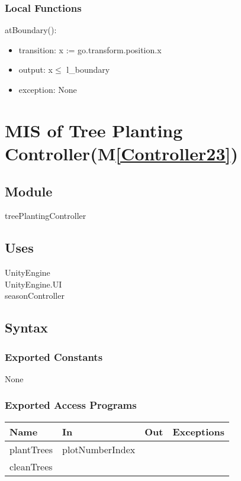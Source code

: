 \documentclass[12pt, titlepage]{article}
\newcommand{\mref}[1]{M\ref{#1}}
\begin{document}
\subsubsection{Local Functions}

\noindent atBoundary():
\begin{itemize}
\item transition: x := go.transform.position.x\\
\item output: x$\leqslant$ l\_boundary\\
\item exception: None\\
\end{itemize}

\newpage

\section{MIS of Tree Planting Controller(\mref{Controller23})}  

\subsection{Module}

treePlantingController

\subsection{Uses}
UnityEngine\\
UnityEngine.UI\\
seasonController\\

\subsection{Syntax}
\subsubsection{Exported Constants}
None
\subsubsection{Exported Access Programs}

\begin{center}
\begin{tabular}{| l | l | l | p{5cm}|}
\hline
\textbf{Name} & \textbf{In} & \textbf{Out} & \textbf{Exceptions} \\
\hline
 plantTrees& plotNumberIndex  &  &  \\
\hline
 cleanTrees&  & & \\
\hline
\end{tabular}
\end{center}
\end{document}

